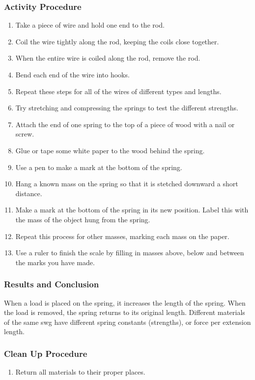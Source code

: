 \subsubsection*{Activity Procedure}
\begin{enumerate}
\item{Take a piece of wire and hold one end to the rod.}
\item{Coil the wire tightly along the rod, keeping the coils close together.}
\item{When the entire wire is coiled along the rod, remove the rod.}
\item{Bend each end of the wire into hooks.}
\item{Repeat these steps for all of the wires of different types and lengths.}
\item{Try stretching and compressing the springs to test the different strengths.}
\item{Attach the end of one spring to the top of a piece of wood with a nail or screw.}
\item{Glue or tape some white paper to the wood behind the spring.}
\item{Use a pen to make a mark at the bottom of the spring.}
\item{Hang a known mass on the spring so that it is stetched downward a short distance.}
\item{Make a mark at the bottom of the spring in its new position.  Label this with the mass of the object hung from the spring.}
\item{Repeat this process for other masses, marking each mass on the paper.}
\item{Use a ruler to finish the scale by filling in masses above, below and between the marks you have made.}
\end{enumerate}

\subsubsection*{Results and Conclusion}
When a load is placed on the spring, it increases the length of the spring.  When the load is removed, the spring returns to its original length.
Different materials of the same swg have different spring constants (strengths), or force per extension length.

\subsubsection*{Clean Up Procedure}
\begin{enumerate}
\item{Return all materials to their proper places.}
\end{enumerate}

